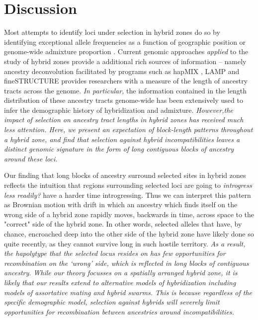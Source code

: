 \documentclass[12pt]{article}
\newcommand{\alisa}[1]{{\em \color{red} #1}}
\newcommand{\yb}[1]{{\em \color{magenta} #1}}
\begin{document}
\section*{Discussion}

Most attempts to identify loci under selection in hybrid zones do so by identifying exceptional allele frequencies as a function of geographic position or genome-wide admixture proportion \citep{Gompert2012,OTHERS}.  
Current genomic approaches \alisa{applied} to the study of hybrid zones provide a additional rich sources of information -- namely ancestry deconvolution facilitated by programs such as hapMIX \citep{Price2009}, LAMP \citep{Sankararaman2008} and fineSTRUCTURE \citep{Lawson2012} provides researchers with a measure of the length of ancestry tracts across the genome.  \alisa{In particular,} the information contained in the length distribution of these ancestry tracts genome-wide  has been extensively used to infer the demographic history of hybridization and admixture.  \alisa{However,the impact of selection on ancestry tract lengths in hybrid zones has received much less attention. Here, we present an expectation of block-length patterns throughout a hybrid zone, and find that selection against hybrid incompatibilities leaves a distinct genomic signature in the form of long contiguous blocks of ancestry around these loci.} 


Our finding that long blocks of ancestry surround selected sites in hybrid zones reflects the intuition that regions surrounding selected loci are going to \alisa{introgress less readily?} have a harder time introgressing. 
Thus we can interpret this pattern as Brownian motion with drift in which an ancestry which finds itself on the wrong side of a hybrid zone rapidly moves, backwards in time, across space to the "correct" side of the hybrid zone.  In other words, selected alleles that have, by chance, encroached deep into the other side of the hybrid zone have likely done so quite recently, as they cannot survive long in such hostile territory.  \alisa{As a result, the hapolytype that the selected locus resides on has few opportunities for recombination on the `wrong' side, which is reflected in long blocks of contiguous ancestry.}
\yb{While our theory focusses on a spatially arranged hybrid zone, it is likely that our results extend to alternative models of hybridization including models of assortative mating and hybrid swarms. This is because regardless of the specific demographic model, selection against hybrids will severely limit opportunities for recombination between ancestries around incompatibilities.}
\end{document}

